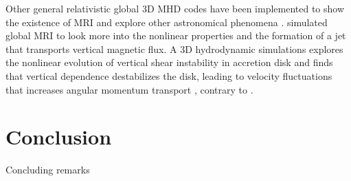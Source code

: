 \documentclass{jfm}
\begin{document}
Other general relativistic global 3D MHD codes have been implemented to show
the existence of MRI and explore other astronomical phenomena
\citep{Villiers2003, Koide2000}. \cite{Kersale2006} simulated global MRI to
look more into the nonlinear properties and the formation of a jet that
transports vertical magnetic flux. A 3D hydrodynamic simulations explores the
nonlinear evolution of vertical shear instability in accretion disk and finds
that vertical dependence destabilizes the disk, leading to velocity
fluctuations that increases angular momentum transport \citep{Arlt2004},
contrary to \cite{Hawley1995}.



\section{Conclusion}
Concluding remarks





\end{document}
